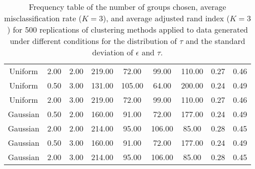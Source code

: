 \documentclass[12pt]{article}
\begin{document}
\begin{table}[ht]
\begin{center}
\begin{tabular}{ccc|cccccc}
  Uniform & 2.00 & 2.00 & 219.00 & 72.00 & 99.00 & 110.00 & 0.27 & 0.46 \\ 
  Uniform & 0.50 & 3.00 & 131.00 & 105.00 & 64.00 & 200.00 & 0.24 & 0.49 \\ 
  Uniform & 2.00 & 3.00 & 219.00 & 72.00 & 99.00 & 110.00 & 0.27 & 0.46 \\ 
  Gaussian & 0.50 & 2.00 & 160.00 & 91.00 & 72.00 & 177.00 & 0.24 & 0.49 \\ 
  Gaussian & 2.00 & 2.00 & 214.00 & 95.00 & 106.00 & 85.00 & 0.28 & 0.45 \\ 
  Gaussian & 0.50 & 3.00 & 160.00 & 91.00 & 72.00 & 177.00 & 0.24 & 0.49 \\ 
  Gaussian & 2.00 & 3.00 & 214.00 & 95.00 & 106.00 & 85.00 & 0.28 & 0.45 \\ 
   \hline\end{tabular}
\caption{Frequency table of the number of groups chosen, average misclassification rate ($K=3$), and average adjusted rand index ($K=3$) for 500 replications of clustering methods applied to data generated under different conditions for the distribution of $\tau$ and the standard deviation of $\epsilon$ and $\tau$.}
\label{fig:se}
\end{center}
\end{table}
\end{document}
